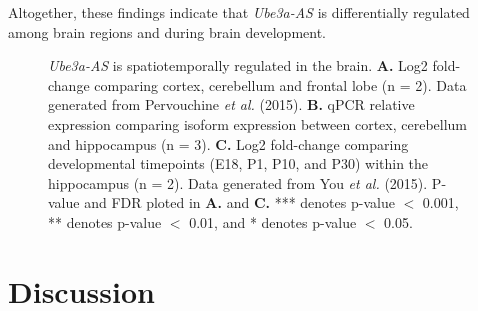 Altogether, these findings indicate that \textit{Ube3a-AS} is differentially regulated among brain regions and during brain development. 

\begin{figure}
  \centering
  \caption{\textit{Ube3a-AS} is spatiotemporally regulated in the brain. \textbf{A.} Log2 fold-change comparing cortex, cerebellum and frontal lobe (n = 2). Data generated from Pervouchine \textit{et al.} (2015). \textbf{B.} qPCR relative expression comparing isoform expression between cortex, cerebellum and hippocampus (n = 3). \textbf{C.} Log2 fold-change comparing developmental timepoints (E18, P1, P10, and P30) within the hippocampus (n = 2). Data generated from You \textit{et al.} (2015). P-value and FDR ploted in \textbf{A.} and \textbf{C.} *** denotes p-value $<$ 0.001, ** denotes p-value $<$ 0.01, and * denotes p-value $<$ 0.05.}
  \label{spatiotemporal regulated}
\end{figure}


\section{Discussion}

